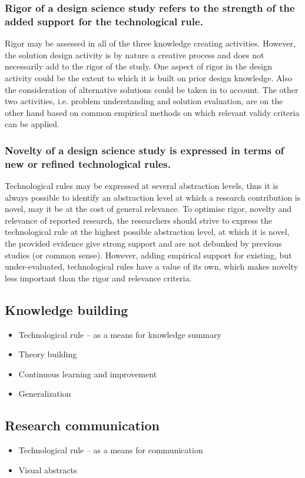 \documentclass[graybox]{svmult}
\begin{document}
\subsubsection{Rigor of a design science study refers to the strength of the added support for the technological rule.} Rigor may be assessed in all of the three knowledge creating activities. However, the solution design activity is by nature a creative process and does not necessarily add to the rigor of the study. One aspect of rigor in the design activity could be the extent to which it is built on prior design knowledge. Also the consideration of alternative solutions could be taken in to account. The other two activities, i.e. problem understanding and solution evaluation, are on the other hand based on common empirical methods on which relevant validy criteria can be applied. 

\subsubsection{Novelty of a design science study is expressed in terms of new or refined technological rules.} Technological rules may be expressed at several abstraction levels, thus it is always possible to identify an abstraction level at which a research contribution is novel, may it be at the cost of general relevance. To optimise rigor, novelty and relevance of reported research, the researchers should strive to express the technological rule at the highest possible abstraction level, at which it is novel, the provided evidence give strong support and are not debunked by previous studies (or common sense). However, adding empirical support for existing, but under-evaluated, technological rules have a value of its own, which makes novelty less important than the rigor and relevance criteria.


\subsection{Knowledge building}
\begin{itemize}
\item Technological rule -- as a means for knowledge summary
\item Theory building
\item Continuous learning and improvement
\item Generalization
\end{itemize}

\subsection{Research communication}
\begin{itemize}
\item Technological rule -- as a means for communication
\item Visual abstracts
\end{itemize}
\end{document}
